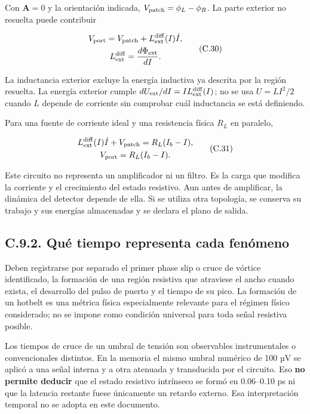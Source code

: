 \documentclass[
  spanish,
  10pt,
  a4paper,
]{article}
\begin{document}
Con \(\mathbf A=0\) y la orientación indicada,
\(V_{\rm patch}=\phi_L-\phi_R\). La parte exterior no resuelta puede
contribuir

\[
\begin{gathered}
V_{\rm port}=V_{\rm patch}+L_{\rm ext}^{\rm diff}(I)\dot I,\\
L_{\rm ext}^{\rm diff}=\frac{d\Phi_{\rm ext}}{dI}.
\end{gathered} \tag{C.30}
\]

La inductancia exterior excluye la energía inductiva ya descrita por la
región resuelta. La energía exterior cumple
\(dU_{\rm ext}/dI=I L_{\rm ext}^{\rm diff}(I)\); no se usa \(U=LI^2/2\)
cuando \(L\) depende de corriente sin comprobar cuál inductancia se está
definiendo.

Para una fuente de corriente ideal y una resistencia física \(R_L\) en
paralelo,

\[
\begin{gathered}
L_{\rm ext}^{\rm diff}(I)\dot I+V_{\rm patch}
=R_L(I_b-I),\\
V_{\rm port}=R_L(I_b-I).
\end{gathered} \tag{C.31}
\]

Este circuito no representa un amplificador ni un filtro. Es la carga
que modifica la corriente y el crecimiento del estado resistivo. Aun
antes de amplificar, la dinámica del detector depende de ella. Si se
utiliza otra topología, se conserva su trabajo y sus energías
almacenadas y se declara el plano de salida.

\subsection{C.9.2. Qué tiempo representa cada
fenómeno}\label{c.9.2.-quuxe9-tiempo-representa-cada-fenuxf3meno}

Deben registrarse por separado el primer phase slip o cruce de vórtice
identificado, la formación de una región resistiva que atraviese el
ancho cuando exista, el desarrollo del pulso de puerto y el tiempo de su
pico. La formación de un hotbelt es una métrica física especialmente
relevante para el régimen físico considerado; no se impone como
condición universal para toda señal resistiva posible.

Los tiempos de cruce de un umbral de tensión son observables
instrumentales o convencionales distintos. En la memoria el mismo umbral
numérico de 100 µV se aplicó a una señal interna y a otra atenuada y
transducida por el circuito. Eso \textbf{no permite deducir} que el
estado resistivo intrínseco se formó en 0.06--0.10 ps ni que la latencia
restante fuese únicamente un retardo externo. Esa interpretación
temporal no se adopta en este documento.
\end{document}
